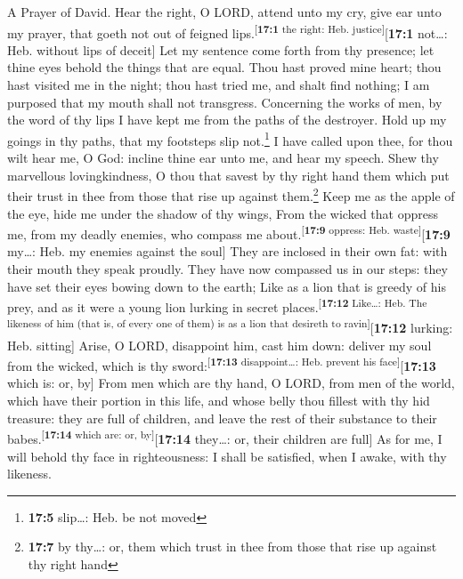 A Prayer of David.  Hear the right, O LORD, attend unto my
cry, give ear unto my prayer, that goeth not out of feigned
lips.\textsuperscript{{[}\textbf{17:1} the right: Heb.
justice{]}}{[}\textbf{17:1} not\ldots: Heb. without lips of deceit{]}
 Let my sentence come forth from thy presence; let thine
eyes behold the things that are equal.  Thou hast proved
mine heart; thou hast visited me in the night; thou hast tried me, and
shalt find nothing; I am purposed that my mouth shall not transgress.
 Concerning the works of men, by the word of thy lips I
have kept me from the paths of the destroyer.  Hold up my
goings in thy paths, that my footsteps slip not.\footnote{\textbf{17:5}
  slip\ldots: Heb. be not moved}  I have called upon thee,
for thou wilt hear me, O God: incline thine ear unto me, and hear my
speech.  Shew thy marvellous lovingkindness, O thou that
savest by thy right hand them which put their trust in thee from those
that rise up against them.\footnote{\textbf{17:7} by thy\ldots: or, them
  which trust in thee from those that rise up against thy right hand}
 Keep me as the apple of the eye, hide me under the shadow
of thy wings,  From the wicked that oppress me, from my
deadly enemies, who compass me about.\textsuperscript{{[}\textbf{17:9}
oppress: Heb. waste{]}}{[}\textbf{17:9} my\ldots: Heb. my enemies
against the soul{]}  They are inclosed in their own fat:
with their mouth they speak proudly.  They have now
compassed us in our steps: they have set their eyes bowing down to the
earth;  Like as a lion that is greedy of his prey, and as
it were a young lion lurking in secret
places.\textsuperscript{{[}\textbf{17:12} Like\ldots: Heb. The likeness
of him (that is, of every one of them) is as a lion that desireth to
ravin{]}}{[}\textbf{17:12} lurking: Heb. sitting{]} 
Arise, O LORD, disappoint him, cast him down: deliver my soul from the
wicked, which is thy sword:\textsuperscript{{[}\textbf{17:13}
disappoint\ldots: Heb. prevent his face{]}}{[}\textbf{17:13} which is:
or, by{]}  From men which are thy hand, O LORD, from men
of the world, which have their portion in this life, and whose belly
thou fillest with thy hid treasure: they are full of children, and leave
the rest of their substance to their
babes.\textsuperscript{{[}\textbf{17:14} which are: or,
by{]}}{[}\textbf{17:14} they\ldots: or, their children are full{]}
 As for me, I will behold thy face in righteousness: I
shall be satisfied, when I awake, with thy likeness.

